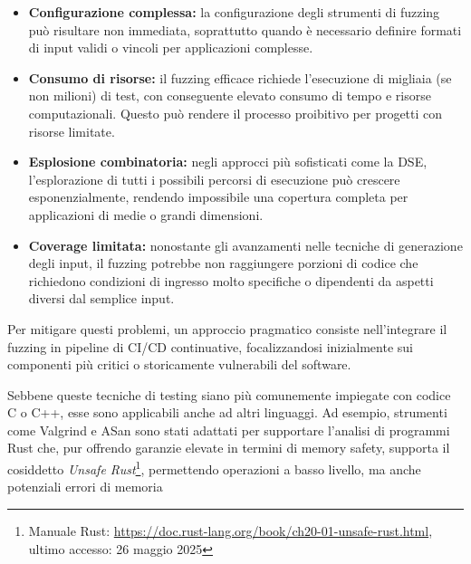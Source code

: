 \begin{itemize}
  \item \textbf{Configurazione complessa:} la configurazione degli strumenti di
    fuzzing può risultare non immediata, soprattutto quando è necessario definire
    formati di input validi o vincoli per applicazioni complesse.

  \item \textbf{Consumo di risorse:} il fuzzing efficace richiede l'esecuzione
    di migliaia (se non milioni) di test, con conseguente elevato consumo di tempo
    e risorse computazionali. Questo può rendere il processo proibitivo per
    progetti con risorse limitate.

  \item \textbf{Esplosione combinatoria:} negli approcci più sofisticati come la
    DSE, l'esplorazione di tutti i possibili percorsi di esecuzione può crescere
    esponenzialmente, rendendo impossibile una copertura completa per
    applicazioni di medie o grandi dimensioni.

  \item \textbf{Coverage limitata:} nonostante gli avanzamenti nelle tecniche di
    generazione degli input, il fuzzing potrebbe non raggiungere porzioni di codice
    che richiedono condizioni di ingresso molto specifiche o dipendenti da aspetti
    diversi dal semplice input.
\end{itemize}

Per mitigare questi problemi, un approccio pragmatico consiste nell'integrare il
fuzzing in pipeline di CI/CD continuative, focalizzandosi inizialmente sui
componenti più critici o storicamente vulnerabili del software.

\bigskip
\noindent
Sebbene queste tecniche di testing siano più comunemente impiegate con codice C
o C++, esse sono applicabili anche ad altri linguaggi. Ad esempio, strumenti come
Valgrind e ASan sono stati adattati per supportare l'analisi di programmi Rust\cite{valgrind_rust}\cite{rust_manual_san}
che, pur offrendo garanzie elevate in termini di memory safety, supporta il cosiddetto
\textit{Unsafe Rust}\footnote{Manuale Rust: \url{https://doc.rust-lang.org/book/ch20-01-unsafe-rust.html},
ultimo accesso: 26 maggio 2025}, permettendo operazioni a basso livello, ma anche
potenziali errori di memoria